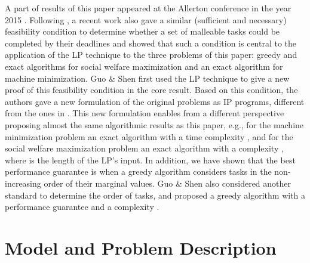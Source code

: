 \documentclass[10pt,journal,compsoc]{IEEEtran}
\begin{document}
A part of results of this paper appeared at the Allerton conference in the year 2015 \cite{Wu15a,Wu15b}. Following \cite{Wu15a,Wu15b}, a recent work also gave a similar (sufficient and necessary) feasibility condition to determine whether a set of malleable tasks could be completed by their deadlines and showed that such a condition is central to the application of the LP technique to the three problems of this paper: greedy and exact algorithms for social welfare maximization and an exact algorithm for machine minimization. Guo \& Shen first used the LP technique to give a new proof of this feasibility condition in the core result. Based on this condition, the authors gave a new formulation of the original problems as IP programs, different from the ones in \cite{Jain11a,Jain}. This new formulation enables from a different perspective proposing almost the same algorithmic results as this paper, e.g., for the machine minimization problem an exact algorithm with a time complexity , and for the social welfare maximization problem an exact algorithm with a complexity , where  is the length of the LP's input. In addition, we have shown that the best performance guarantee is  when a greedy algorithm considers tasks in the non-increasing order of their marginal values. Guo \& Shen also considered another standard to determine the order of tasks, and proposed a greedy algorithm with a performance guarantee  and a complexity .






















































\section{Model and Problem Description}
\label{sec.model}
\end{document}
